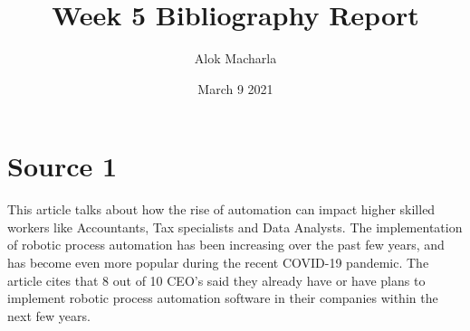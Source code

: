\documentclass{article}
\title{Week 5 Bibliography Report}
\author{Alok Macharla}
\date{March 9 2021}
\begin{document}
\maketitle

\section{Source 1}
This article talks about how the rise of automation can impact higher skilled workers like Accountants, Tax specialists and Data Analysts. The implementation of robotic process automation has been increasing over the past few years, and has become even more popular during the recent COVID-19 pandemic. The article cites that 8 out of 10 CEO's said they already have or have plans to implement robotic process automation software in their companies within the next few years. \cite{roose_2021} 



\end{document}
